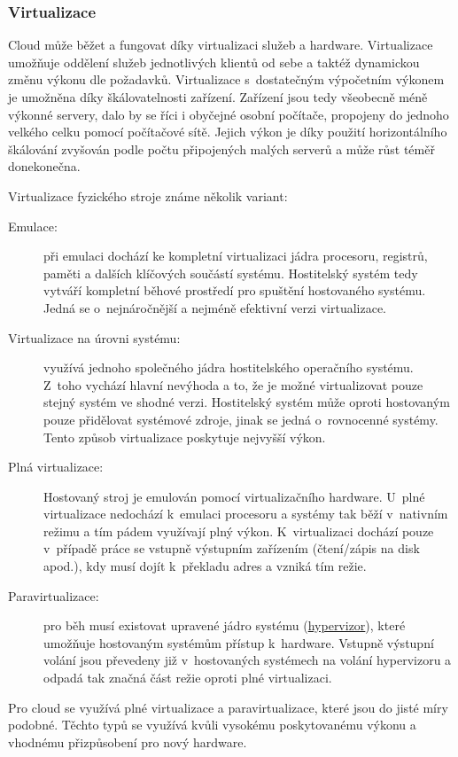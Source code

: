 \subsubsection{Virtualizace}
\label{sec:virtualizace}
Cloud může běžet a fungovat díky virtualizaci služeb a hardware. Virtualizace umožňuje oddělení služeb jednotlivých klientů od sebe a taktéž dynamickou změnu výkonu dle požadavků. Virtualizace s~dostatečným výpočetním výkonem je umožněna díky škálovatelnosti zařízení. Zařízení jsou tedy všeobecně méně výkonné servery, dalo by se říci i obyčejné osobní počítače, propojeny do jednoho velkého celku pomocí počítačové sítě. Jejich výkon je díky použití horizontálního škálování zvyšován podle počtu připojených malých serverů a může růst téměř donekonečna.

Virtualizace fyzického stroje známe několik variant\cite{zive.cz:virtualizace}:
\begin{description}
\item[Emulace:] při emulaci dochází ke kompletní virtualizaci jádra procesoru, registrů, paměti a dalších klíčových součástí systému. Hostitelský systém tedy vytváří kompletní běhové prostředí pro spuštění hostovaného systému. Jedná se o~nejnáročnější a nejméně efektivní verzi virtualizace.
	\item[Virtualizace na úrovni systému:] využívá jednoho společného jádra hostitelského operačního systému. Z~toho vychází hlavní nevýhoda a to, že je možné virtualizovat pouze stejný systém ve shodné verzi. Hostitelský systém může oproti hostovaným pouze přidělovat systémové zdroje, jinak se jedná o~rovnocenné systémy. Tento způsob virtualizace poskytuje nejvyšší výkon.
	\item[Plná virtualizace:] Hostovaný stroj je emulován pomocí virtualizačního hardware. U~plné virtualizace nedochází k~emulaci procesoru a systémy tak běží v~nativním režimu a tím pádem využívají plný výkon. K~virtualizaci dochází pouze v~případě práce se vstupně výstupním zařízením (čtení/zápis na disk apod.), kdy musí dojít k~překladu adres a vzniká tím režie.
	\item[Paravirtualizace:] pro běh musí existovat upravené jádro systému (\href{http://cs.wikipedia.org/wiki/Hypervizor}{hypervizor}), které umožňuje hostovaným systémům přístup k~hardware. Vstupně výstupní volání jsou převedeny již v~hostovaných systémech na volání hypervizoru a odpadá tak značná část režie oproti plné virtualizaci.
\end{description}
Pro cloud se využívá plné virtualizace a paravirtualizace, které jsou do jisté míry podobné. Těchto typů se využívá kvůli vysokému poskytovanému výkonu a vhodnému přizpůsobení pro nový hardware.

